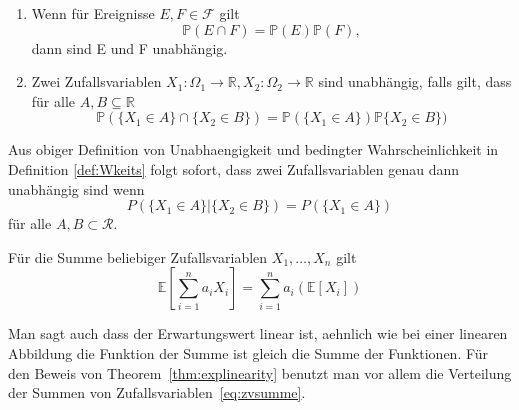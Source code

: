 \begin{Def}

\begin{enumerate}
	\item Wenn f\"ur Ereignisse $E, F \in \mathcal{F} $ gilt
	\begin{equation} 
	\mathbb{P} (E\cap F)= \mathbb{P} (E)  \mathbb{P} (F),
	\end{equation}
        dann sind E und F unabhängig. 
\item Zwei Zufallsvariablen $X_1 : \Omega_1 \to \mathbb{R}, X_2:\Omega_2 \to \mathbb{R}$
sind unabhängig, falls gilt, dass für alle $A, B \subseteq \mathbb{R}$
\begin{equation*}
\mathbb{P} (\{X_{1} \in A\} \cap \{X_{2} \in B\} ) = \mathbb{P} (\{X_{1} \in A\})  \mathbb{P} \{X_{2} \in B\} )
\end{equation*}
\end{enumerate}

Aus obiger Definition von Unabhaengigkeit und bedingter Wahrscheinlichkeit in Definition \ref{def:Wkeits} folgt sofort, dass zwei Zufallsvariablen  genau dann unabh\"angig sind wenn
\begin{equation*}
P(\{X_1 \in A\} | \{X_2 \in B\}) = P(\{X_1\in A\})
\end{equation*}
f\"ur alle $A,B \subset \mathcal{R}$. 

\end{Def}


\begin{Thm}
\label{thm:explinearity}
Für die Summe beliebiger Zufallsvariablen $X_{1}, \dots, X_{n}$ gilt
\begin{equation*}
\mathbb{E} \left[\sum_{i=1}^{n} a_{i} X_{i}\right] = \sum_{i=1}^{n} a_{i} (\mathbb{E} [X_{i}] )
\end{equation*}
\end{Thm}

Man sagt auch dass der Erwartungswert linear ist, aehnlich wie bei einer linearen Abbildung die Funktion der Summe ist gleich die Summe der Funktionen. F\"ur den Beweis von Theorem~\ref{thm:explinearity} benutzt man vor allem die Verteilung der Summen von Zufallsvariablen~\eqref{eq:zvsumme}.

